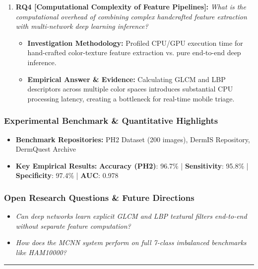 \begin{enumerate}[label=\textbf{\arabic*.}, leftmargin=*]
\begin{itemize}[leftmargin=1.5em]
  \end{itemize}
  \item \textbf{RQ4 [Computational Complexity of Feature Pipelines]:} \textit{What is the computational overhead of combining complex handcrafted feature extraction with multi-network deep learning inference?}
  \begin{itemize}[leftmargin=1.5em]
    \item \textbf{Investigation Methodology:} Profiled CPU/GPU execution time for hand-crafted color-texture feature extraction vs. pure end-to-end deep inference.
    \item \textbf{Empirical Answer \& Evidence:} Calculating GLCM and LBP descriptors across multiple color spaces introduces substantial CPU processing latency, creating a bottleneck for real-time mobile triage.
  \end{itemize}
\end{enumerate}

\subsubsection*{Experimental Benchmark \& Quantitative Highlights}
\begin{itemize}[leftmargin=*]
  \item \textbf{Benchmark Repositories:} PH2 Dataset (200 images), DermIS Repository, DermQuest Archive
  \item \textbf{Key Empirical Results:} \textbf{Accuracy (PH2)}: 96.7\% \quad | \quad \textbf{Sensitivity}: 95.8\% \quad | \quad \textbf{Specificity}: 97.4\% \quad | \quad \textbf{AUC}: 0.978
\end{itemize}

\subsubsection*{Open Research Questions \& Future Directions}
\begin{itemize}[leftmargin=*]
  \item \textit{Can deep networks learn explicit GLCM and LBP textural filters end-to-end without separate feature computation?}
  \item \textit{How does the MCNN system perform on full 7-class imbalanced benchmarks like HAM10000?}
\end{itemize}
\vspace{0.8em}\hrule\vspace{1.2em}
